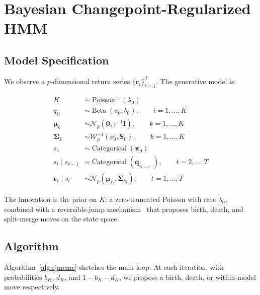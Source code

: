 \documentclass[12pt,oneside]{book}
\begin{document}
\chapter{Bayesian Changepoint-Regularized HMM}

\section{Model Specification}

We observe a $p$-dimensional return series $\{\mathbf{r}_t\}_{t=1}^{T}$. The generative model is:

\begin{dukebox}[title={Hierarchical Model},colbacktitle=DukeBlue!15]
\begin{align}
K &\sim \operatorname{Poisson}^{+}(\lambda_0) \label{eq:priork} \\
q_{ii} &\sim \operatorname{Beta}(a_0, b_0), \qquad i=1,\dots,K \label{eq:priordiag} \\
\boldsymbol{\mu}_k &\sim \mathcal{N}_p(\mathbf{0}, \tau^{-1}\mathbf{I}), \qquad k=1,\dots,K \label{eq:priormean} \\
\boldsymbol{\Sigma}_k &\sim \mathcal{W}^{-1}_p(\nu_0, \mathbf{S}_0), \qquad k=1,\dots,K \label{eq:priorsigma} \\
s_1 &\sim \operatorname{Categorical}(\boldsymbol{\pi}_0) \nonumber \\
s_t \mid s_{t-1} &\sim \operatorname{Categorical}(\mathbf{q}_{s_{t-1},\cdot}), \qquad t=2,\dots,T \nonumber \\
\mathbf{r}_t \mid s_t &\sim \mathcal{N}_p(\boldsymbol{\mu}_{s_t}, \boldsymbol{\Sigma}_{s_t}), \qquad t=1,\dots,T \nonumber
\end{align}
\end{dukebox}

\noindent The innovation is the prior on $K$: a zero-truncated Poisson with rate $\lambda_0$, combined with a reversible-jump mechanism~\cite{green1995} that proposes birth, death, and split-merge moves on the state space.

\section{Algorithm}

Algorithm~\ref{alg:rjmcmc} sketches the main loop. At each iteration, with probabilities $b_K$, $d_K$, and $1-b_K-d_K$, we propose a birth, death, or within-model move respectively.
\end{document}
